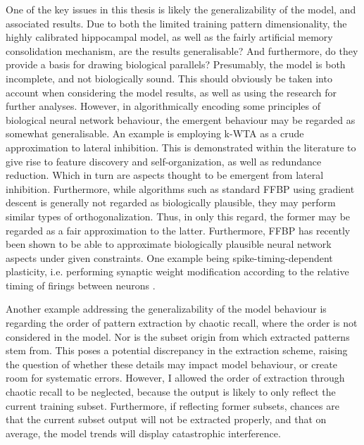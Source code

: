 

One of the key issues in this thesis is likely the generalizability of the model, and associated results. Due to both the limited training pattern dimensionality, the highly calibrated hippocampal model, as well as the fairly artificial memory consolidation mechanism, are the results generalisable? And furthermore, do they provide a basis for drawing biological parallels?
Presumably, the model is both incomplete, and not biologically sound. This should obviously be taken into account when considering the model results, as well as using the research for further analyses. However, in algorithmically encoding some principles of biological neural network behaviour, the emergent behaviour may be regarded as somewhat generalisable.
An example is employing k-WTA as a crude approximation to lateral inhibition. This is demonstrated within the literature to give rise to feature discovery and self-organization, as well as redundance reduction. Which in turn are aspects thought to be emergent from lateral inhibition. 
Furthermore, while algorithms such as standard FFBP using gradient descent is generally not regarded as biologically plausible, they may perform similar types of orthogonalization. Thus, in only this regard, the former may be regarded as a fair approximation to the latter. Furthermore, FFBP has recently been shown to be able to approximate biologically plausible neural network aspects under given constraints. One example being spike-timing-dependent plasticity, i.e. performing synaptic weight modification according to the relative timing of firings between neurons \citep{Bengio2015}.

Another example addressing the generalizability of the model behaviour is regarding the order of pattern extraction by chaotic recall, where the order is not considered in the model. Nor is the subset origin from which extracted patterns stem from. This poses a potential discrepancy in the extraction scheme, raising the question of whether these details may impact model behaviour, or create room for systematic errors. However, I allowed the order of extraction through chaotic recall to be neglected, because the output is likely to only reflect the current training subset. Furthermore, if reflecting former subsets, chances are that the current subset output will not be extracted properly, and that on average, the model trends will display catastrophic interference.

